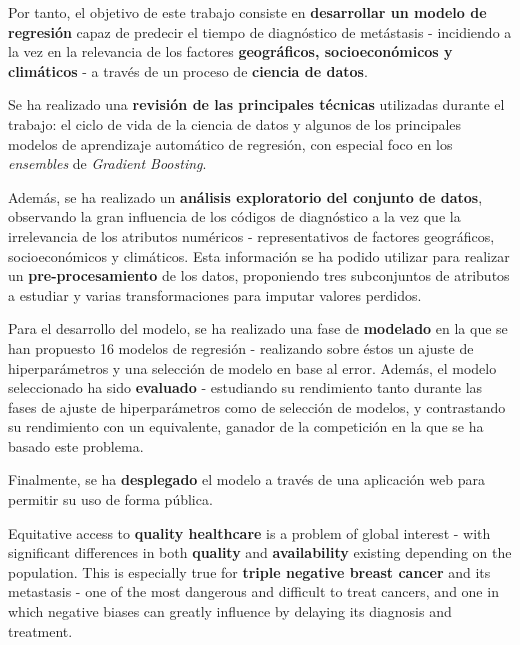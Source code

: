 Por tanto, el objetivo de este trabajo consiste en \textbf{desarrollar un modelo de regresión} capaz de predecir el tiempo de diagnóstico de metástasis - incidiendo a la vez en la relevancia de los factores \textbf{geográficos, socioeconómicos y climáticos} - a través de un proceso de \textbf{ciencia de datos}.

Se ha realizado una \textbf{revisión de las principales técnicas} utilizadas durante el trabajo: el ciclo de vida de la ciencia de datos y algunos de los principales modelos de aprendizaje automático de regresión, con especial foco en los \textit{ensembles} de \textit{Gradient Boosting}.

Además, se ha realizado un \textbf{análisis exploratorio del conjunto de datos}, observando la gran influencia de los códigos de diagnóstico a la vez que la irrelevancia de los atributos numéricos - representativos de factores geográficos, socioeconómicos y climáticos. Esta información se ha podido utilizar para realizar un \textbf{pre-procesamiento} de los datos, proponiendo tres subconjuntos de atributos a estudiar y varias transformaciones para imputar valores perdidos.

Para el desarrollo del modelo, se ha realizado una fase de \textbf{modelado} en la que se han propuesto 16 modelos de regresión - realizando sobre éstos un ajuste de hiperparámetros y una selección de modelo en base al error. Además, el modelo seleccionado ha sido \textbf{evaluado} - estudiando su rendimiento tanto durante las fases de ajuste de hiperparámetros como de selección de modelos, y contrastando su rendimiento con un equivalente, ganador de la competición en la que se ha basado este problema.

Finalmente, se ha \textbf{desplegado} el modelo a través de una aplicación web para permitir su uso de forma pública.

\cleardoublepage
\thispagestyle{plain}
\begin{center}
	\Large{}
\end{center}
\vskip1cm

Equitative access to \textbf{quality healthcare} is a problem of global interest - with significant differences in both \textbf{quality} and \textbf{availability} existing depending on the population. This is especially true for \textbf{triple negative breast cancer} and its metastasis - one of the most dangerous and difficult to treat cancers, and one in which negative biases can greatly influence by delaying its diagnosis and treatment.

